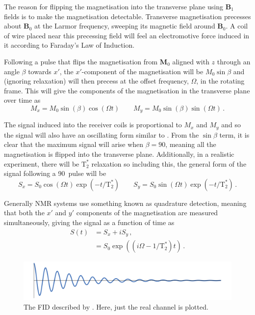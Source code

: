 The reason for flipping the magnetisation into the transverse plane using $\mathbf{B}_1$ fields is to make the magnetisation detectable. 
Transverse magnetisation precesses about $\mathbf{B}_0$ at the Larmor frequency, sweeping its magnetic field around $\mathbf{B}_0$. 
A coil of wire placed near this precessing field will feel an electromotive force induced in it according to Faraday's Law of Induction\cite{Haacke1999}.

Following a pulse that flips the magnetisation from $\mathbf{M}_0$ aligned with $z$ through an angle $\beta$ towards $x'$, the $x'$-component of the magnetisation will be $M_0\sin\beta$ and (ignoring relaxation) will then precess at the offset frequency, $\Omega$, in the rotating frame. This will give the components of the magnetisation in the transverse plane over time as 
\begin{equation}
M_x = M_0\sin(\beta)\cos(\Omega t) \qquad M_y = M_0\sin(\beta)\sin(\Omega t)\,.\label{eq:MxMy}
\end{equation}

The signal induced into the receiver coils is proportional to $M_x$ and $M_y$ and so the signal will also have an oscillating form similar to .
From the $\sin\beta$ term, it is clear that the maximum signal will arise when $\beta = 90$\degree, meaning all the magnetisation is flipped into the transverse plane. 
Additionally, in a realistic experiment, there will be $\mathrm{T_2^*}$ relaxation so including this, the general form of the signal following a 90\degree\ pulse will be\cite{DeGraaf2007} 
\begin{equation}
S_x = S_0\cos(\Omega t)\exp\left(-t/\mathrm{T}_2^*\right) \qquad S_y = S_0\sin(\Omega t)\exp\left(-t/\mathrm{T}_2^*\right)\,.
\end{equation}

Generally \ac{NMR} systems use something known as quadrature detection, meaning that both the $x'$ and $y'$ components of the magnetisation are measured simultaneously\cite{Levitt2008}, giving the signal as a function of time as 
\begin{align}
	S(t) &= S_x + iS_y\,,\nonumber\\
		 &= S_0\exp((i\Omega - 1/\mathrm{T}_2^*)t)\,.\label{eq:fid}
\end{align}  

\begin{figure}
  \centering
  \includegraphics[width=\textwidth]{figures/background/FID_copy.png}
  \caption[The \acl{FID} described by ]{The \acl{FID} described by . Here, just the real channel is plotted.}
  \label{fig:fid}
\end{figure}

